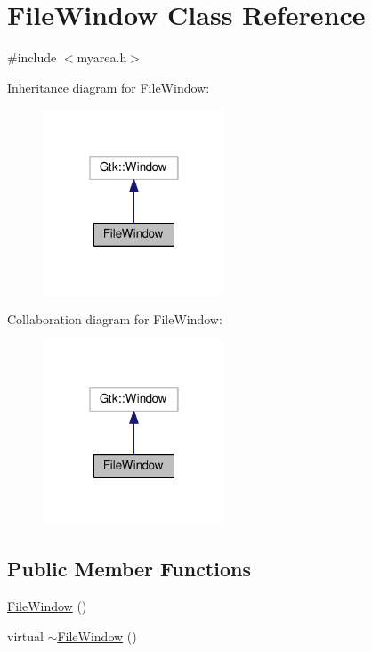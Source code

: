 \hypertarget{class_file_window}{}\section{File\+Window Class Reference}
\label{class_file_window}


{\ttfamily \#include $<$myarea.\+h$>$}



Inheritance diagram for File\+Window\+:
\nopagebreak
\begin{figure}[H]
\begin{center}
\leavevmode
\includegraphics[width=154pt]{class_file_window__inherit__graph}
\end{center}
\end{figure}


Collaboration diagram for File\+Window\+:
\nopagebreak
\begin{figure}[H]
\begin{center}
\leavevmode
\includegraphics[width=154pt]{class_file_window__coll__graph}
\end{center}
\end{figure}
\subsection*{Public Member Functions}
\begin{DoxyCompactItemize}
\item 
\hyperlink{class_file_window_aa90776803aafb4745b145620e7f8390a}{File\+Window} ()
\item 
virtual \hyperlink{class_file_window_aa699c56901fb51fbc3a6646f999d83f1}{$\sim$\+File\+Window} ()
\end{DoxyCompactItemize}
